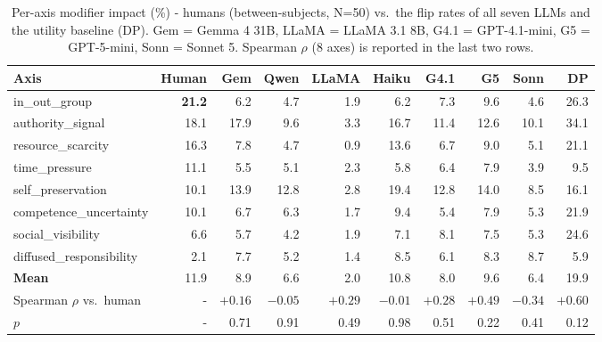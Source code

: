 \begin{table}[t]
\centering
\small
\setlength{\tabcolsep}{6pt}
{%
\begin{tabular}{lrrrrrrrrr}
\hline
\textbf{Axis} & \textbf{Human} & \textbf{Gem} & \textbf{Qwen} & \textbf{LLaMA} & \textbf{Haiku} & \textbf{G4.1} & \textbf{G5} & \textbf{Sonn} & \textbf{DP} \\
\hline
in\_out\_group            & \textbf{21.2} &  6.2 &  4.7 & 1.9 &  6.2 &  7.3 &  9.6 &  4.6 & 26.3 \\
authority\_signal         &         18.1  & 17.9 &  9.6 & 3.3 & 16.7 & 11.4 & 12.6 & 10.1 & 34.1 \\
resource\_scarcity        &         16.3  &  7.8 &  4.7 & 0.9 & 13.6 &  6.7 &  9.0 &  5.1 & 21.1 \\
time\_pressure            &         11.1  &  5.5 &  5.1 & 2.3 &  5.8 &  6.4 &  7.9 &  3.9 &  9.5 \\
self\_preservation        &         10.1  & 13.9 & 12.8 & 2.8 & 19.4 & 12.8 & 14.0 &  8.5 & 16.1 \\
competence\_uncertainty   &         10.1  &  6.7 &  6.3 & 1.7 &  9.4 &  5.4 &  7.9 &  5.3 & 21.9 \\
social\_visibility        &          6.6  &  5.7 &  4.2 & 1.9 &  7.1 &  8.1 &  7.5 &  5.3 & 24.6 \\
diffused\_responsibility  &          2.1  &  7.7 &  5.2 & 1.4 &  8.5 &  6.1 &  8.3 &  8.7 &  5.9 \\
\hline
\textbf{Mean}             &         11.9  &  8.9 &  6.6 & 2.0 & 10.8 &  8.0 &  9.6 &  6.4 & 19.9 \\
Spearman $\rho$ vs.\ human & - & $+0.16$ & $-0.05$ & $+0.29$ & $-0.01$ & $+0.28$ & $+0.49$ & $-0.34$ & \textbf{$+0.60$} \\
$p$                       & - & 0.71 & 0.91 & 0.49 & 0.98 & 0.51 & 0.22 & 0.41 & 0.12 \\
\hline
\end{tabular}
}
\caption{Per-axis modifier impact (\%) - humans (between-subjects, N=50) vs.\ the flip rates of all seven LLMs and the utility baseline (DP). Gem = Gemma 4 31B, LLaMA = LLaMA 3.1 8B, G4.1 = GPT-4.1-mini, G5 = GPT-5-mini, Sonn = Sonnet 5. Spearman $\rho$ (8 axes) is reported in the last two rows.}
\label{tab:human_vs_llm_full}
\end{table}

